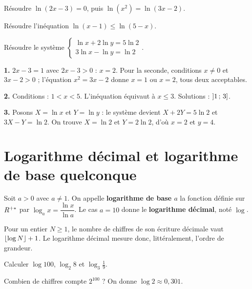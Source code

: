 \begin{entrainement}
\exo[\niveau{1}] Résoudre $\ln(2x-3) = 0$, puis $\ln(x^{2}) = \ln(3x-2)$.

\exo[\niveau{2}] Résoudre l'inéquation $\ln(x-1) \leq \ln(5-x)$.

\exo[\niveau{3}] Résoudre le système
$\begin{cases} \ln x + 2\ln y = 5\ln 2 \\ 3\ln x - \ln y = \ln 2 \end{cases}$.
\end{entrainement}

\begin{corrige}
\textbf{1.} $2x-3 = 1$ avec $2x-3>0$ : $x = 2$. Pour la seconde, conditions
$x \neq 0$ et $3x-2>0$ ; l'équation $x^{2} = 3x-2$ donne $x=1$ ou $x=2$, tous
deux acceptables.

\textbf{2.} Conditions : $1<x<5$. L'inéquation équivaut à $x \leq 3$.
Solutions : $\left]1\,;\,3\right]$.

\textbf{3.} Posons $X = \ln x$ et $Y = \ln y$ : le système devient
$X+2Y = 5\ln2$ et $3X-Y = \ln2$. On trouve $X = \ln 2$ et $Y = 2\ln 2$, d'où
$x = 2$ et $y = 4$.
\end{corrige}

\section{Logarithme décimal et logarithme de base quelconque}

\begin{definition}
Soit $a>0$ avec $a \neq 1$. On appelle \textbf{logarithme de base $a$} la
fonction définie sur $R^{+*}$ par
$\log_{a} x = \dfrac{\ln x}{\ln a}$.
Le cas $a = 10$ donne le \textbf{logarithme décimal}, noté $\log$.
\end{definition}

\begin{remarque}
Pour un entier $N \geq 1$, le nombre de chiffres de son écriture décimale vaut
$\left\lfloor \log N \right\rfloor+1$. Le logarithme décimal mesure donc, littéralement, l'ordre de
grandeur.
\end{remarque}

\begin{entrainement}
\exo[\niveau{1}] Calculer $\log 100$, $\log_{2} 8$ et $\log_{3} \frac{1}{9}$.

\exo[\niveau{2}] Combien de chiffres compte $2^{100}$ ? On donne
$\log 2 \approx 0{,}301$.
\end{entrainement}

